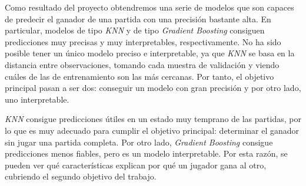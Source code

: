 
Como resultado del proyecto obtendremos una serie de modelos que son capaces
de predecir el ganador de una partida con una precisión bastante
alta. En particular, modelos de tipo \emph{KNN} y de tipo \emph{Gradient Boosting}
consiguen predicciones muy precisas y muy interpretables, respectivamente. No
ha sido posible tener un único modelo preciso e interpretable, ya que \emph{KNN}
se basa en la distancia entre observaciones, tomando cada muestra de validación
y viendo cuáles de las de entrenamiento son las más cercanas.
Por tanto, el objetivo principal pasan a ser dos: conseguir un modelo con gran
precisión y por otro lado, uno interpretable.


\emph{KNN} consigue predicciones útiles en un estado muy temprano
de las partidas, por lo que es muy adecuado para cumplir el objetivo principal:
determinar el ganador sin jugar una partida completa.
Por otro lado, \emph{Gradient Boosting} consigue predicciones menos fiables,
pero es un modelo interpretable. Por esta razón, se pueden ver qué
características explican por qué un jugador gana al otro, cubriendo el
segundo objetivo del trabajo.


